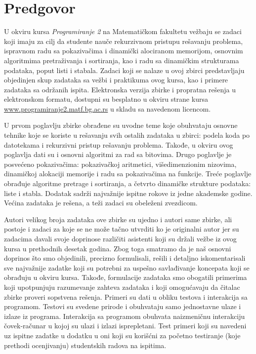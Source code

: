 
\chapter*{Predgovor}

U okviru kursa {\em Programiranje 2} na Matematičkom fakultetu vežbaju se zadaci 
koji imaju za cilj da studente nauče rekurzivnom pristupu rešavanju problema, 
ispravnom radu sa pokazivačima i dinamički alociranom memorijom, osnovnim algoritmima 
pretraživanja i sortiranja, kao i radu sa dinamičkim strukturama podataka, 
poput listi i stabala. Zadaci koji se nalaze u ovoj zbirci predstavljaju 
objedinjen skup zadataka sa vežbi i praktikuma ovog kursa, kao i primere 
zadataka sa održanih ispita. 
Elektronska verzija zbirke i propratna rešenja u elektronskom formatu, dostupni su 
besplatno u okviru strane kursa \url{www.programiranje2.matf.bg.ac.rs} u skladu sa navedenom licencom.


U prvom poglavlju zbirke obrađene su uvodne teme koje obuhvataju osnovne tehnike koje se koriste u rešavanju svih ostalih zadataka u zbirci: podela koda po datotekama i rekurzivni pristup rešavanju problema. Takođe, u okviru ovog poglavlja dati su i osnovni algoritmi za rad sa bitovima. Drugo poglavlje je posvećeno pokazivačima: pokazivačkoj aritmetici, višedimenzionim nizovima, dinamičkoj alokaciji memorije i radu sa pokazivačima na funkcije. Treće poglavlje obrađuje algoritme pretrage i sortiranja, a četvrto dinamičke strukture podataka: liste i stabla. Dodatak sadrži najvažnije ispitne rokove iz jedne akademske godine. Većina zadataka je rešena, a teži zadaci su obeleženi zvezdicom.


Autori velikog broja zadataka ove zbirke su ujedno i autori same zbirke, ali postoje 
i zadaci za koje se ne može tačno utvrditi ko je originalni autor jer su zadacima 
davali svoje doprinose različiti asistenti koji su držali vežbe iz ovog kursa u 
prethodnih desetak godina. Zbog toga smatramo da je naš osnovni doprinos 
što smo objedinili, precizno formulisali, rešili i detaljno iskomentarisali 
sve najvažnije zadatke koji su potrebni za uspešno savlađivanje koncepata 
koji se obrađuju u okviru kursa. Takođe, formulacije zadataka smo obogatili
primerima koji upotpunjuju razumevanje zahteva zadataka i koji omogućavaju
da čitalac zbirke proveri sopstvena rešenja. Primeri su dati u obliku 
testova i interakcija sa programom. Testovi su svedene prirode i obuhvataju 
samo jednostavne ulaze i izlaze iz programa. Interakcija sa programom obuhvata 
naizmeničnu interakciju čovek-računar u kojoj su ulazi i izlazi isprepletani.
Test primeri koji su navedeni uz ispitne zadatke u dodatku u oni koji su korišćni za 
početno testiranje (koje prethodi ocenjivanju) studentskih radova na ispitima.

